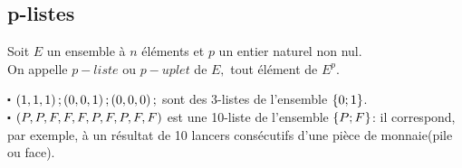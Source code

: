 \subsection{p-listes}
\begin{definition}
Soit $ E $ un ensemble à $ n $ éléments et $ p $ un entier naturel non nul.\\
On appelle  $p-liste$ ou $p-uplet$  de $ E, $ tout élément de $ E^{p} .$
\end{definition}
\begin{example}
$ \centerdot $ $ \left(1,1,1\right); \left(0,0,1\right);\left(0,0,0\right); $ sont des 3-listes de l'ensemble $ \left\{0;1\right\} $.\\
$ \centerdot $  $ \left(P,P,F,F,F,P,F,P,F,F\right) $ est une 10-liste de l'ensemble $ \left\{P;F\right\} $: il correspond, par exemple, à un résultat de 10 lancers consécutifs d'une pièce de monnaie(pile ou face).
\end{example}
